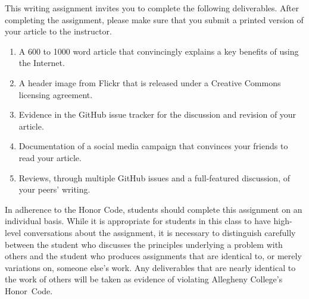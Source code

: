 This writing assignment invites you to complete the following deliverables. After completing the assignment, please make
sure that you submit a printed version of your article to the instructor.

\vspace*{-.1in}
\begin{enumerate}
  \setlength{\itemsep}{-.01in}

  \item A 600 to 1000 word article that convincingly explains a key benefits of using the Internet.
  \item A header image from Flickr that is released under a Creative Commons licensing agreement.
  \item Evidence in the GitHub issue tracker for the discussion and revision of your article.
  \item Documentation of a social media campaign that convinces your friends to read your article.
  \item Reviews, through multiple GitHub issues and a full-featured discussion, of your peers' writing.

\end{enumerate}
\vspace*{-.1in}

In adherence to the Honor Code, students should complete this assignment on an individual basis. While it is appropriate
for students in this class to have high-level conversations about the assignment, it is necessary to distinguish
carefully between the student who discusses the principles underlying a problem with others and the student who produces
assignments that are identical to, or merely variations on, someone else's work. Any deliverables that are nearly
identical to the work of others will be taken as evidence of violating Allegheny College's \mbox{Honor Code}.



